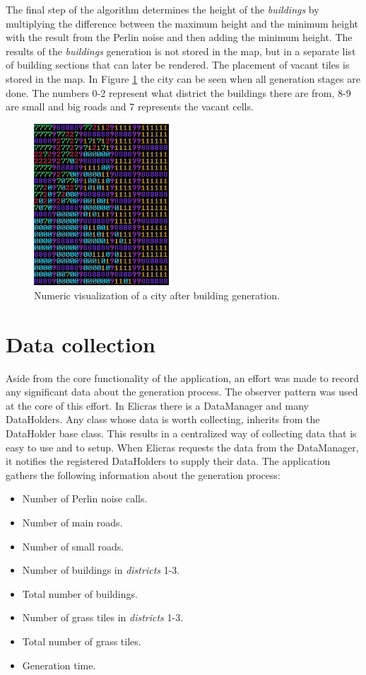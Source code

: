 		The final step of the algorithm determines the height of the \textit{buildings} by multiplying the difference between the maximum height and the minimum height with the result from the Perlin noise and then adding the minimum height. The results of the \textit{buildings} generation is not stored in the map, but in a separate list of building sections that can later be rendered. The placement of vacant tiles is stored in the map. In Figure \ref{fig:map-grass} the city can be seen when all generation stages are done. The numbers 0-2 represent what district the buildings there are from, 8-9 are small and big roads and 7 represents the vacant cells.
		
	\begin{figure}[h]
		\centering
		\includegraphics[width=0.45\textwidth]{"Images/map grass colored"}
		\caption{Numeric visualization of a city after building generation.}
		\label{fig:map-grass}
	\end{figure}

\clearpage
\section{Data collection}
	Aside from the core functionality of the application, an effort was made to record any significant data about the generation process. The observer pattern was used at the core of this effort. In Elicras there is a DataManager and many DataHolders. Any class whose data is worth collecting, inherits from the DataHolder base class. This results in a centralized way of collecting data that is easy to use and to setup. When Elicras requests the data from the DataManager, it notifies the registered DataHolders to supply their data. The application gathers the following information about the generation process:
	\begin{itemize}
		\setlength\itemsep{0.01cm}
		\item Number of Perlin noise calls.
		\item Number of main roads.
		\item Number of small roads.
		\item Number of buildings in \textit{districts} 1-3.
		\item Total number of buildings.
		\item Number of grass tiles in \textit{districts} 1-3.
		\item Total number of grass tiles.
		\item Generation time.
	\end{itemize}
	
